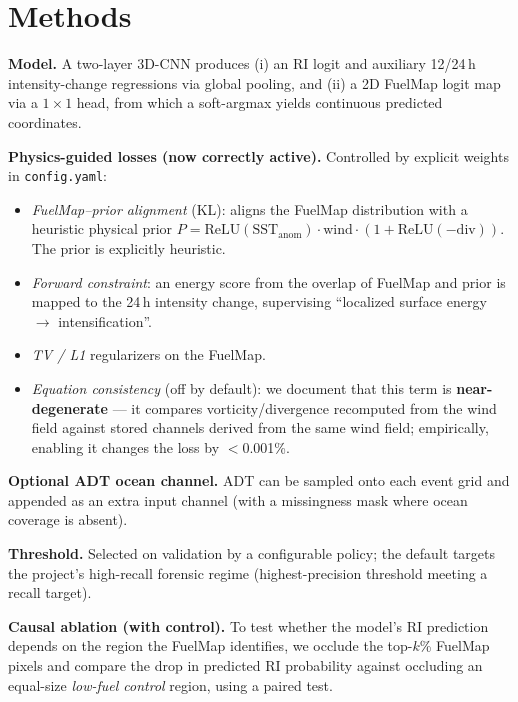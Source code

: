 \documentclass[11pt]{article}
\begin{document}
\section{Methods}

\textbf{Model.} A two-layer 3D-CNN produces (i) an RI logit and auxiliary
12/24\,h intensity-change regressions via global pooling, and (ii) a 2D
FuelMap logit map via a $1\times1$ head, from which a soft-argmax yields
continuous predicted coordinates.

\textbf{Physics-guided losses (now correctly active).} Controlled by explicit
weights in \texttt{config.yaml}:
\begin{itemize}
  \item \emph{FuelMap--prior alignment} (KL): aligns the FuelMap distribution
        with a heuristic physical prior
        $P = \mathrm{ReLU}(\mathrm{SST}_{\mathrm{anom}})\cdot
        \mathrm{wind}\cdot(1+\mathrm{ReLU}(-\mathrm{div}))$. The prior is
        explicitly heuristic.
  \item \emph{Forward constraint}: an energy score from the overlap of
        FuelMap and prior is mapped to the 24\,h intensity change,
        supervising ``localized surface energy $\rightarrow$
        intensification''.
  \item \emph{TV / L1} regularizers on the FuelMap.
  \item \emph{Equation consistency} (off by default): we document that this
        term is \textbf{near-degenerate} --- it compares
        vorticity/divergence recomputed from the wind field against stored
        channels derived from the same wind field; empirically, enabling it
        changes the loss by $<$0.001\%.
\end{itemize}

\textbf{Optional ADT ocean channel.} ADT can be sampled onto each event grid
and appended as an extra input channel (with a missingness mask where ocean
coverage is absent).

\textbf{Threshold.} Selected on validation by a configurable policy; the
default targets the project's high-recall forensic regime
(highest-precision threshold meeting a recall target).

\textbf{Causal ablation (with control).} To test whether the model's RI
prediction depends on the region the FuelMap identifies, we occlude the
top-$k$\% FuelMap pixels and compare the drop in predicted RI probability
against occluding an equal-size \emph{low-fuel control} region, using a
paired test.
\end{document}
